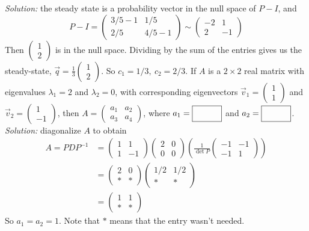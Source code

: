     \ifnum {} {\color{DarkBlue} \textit{Solution:} the steady state is a probability vector in the null space of $P-I$, and $$P-I = \begin{pmatrix} 3/5-1&1/5\\2/5&4/5-1 \end{pmatrix} \sim \begin{pmatrix} -2&1\\2&-1\end{pmatrix}$$ Then $\begin{pmatrix} 1\\2\end{pmatrix}$ is in the null space. Dividing by the sum of the entries gives us the steady-state, $\vec q = \frac13 \begin{pmatrix} 1\\2\end{pmatrix}$. So $c_1 = 1/3, \ c_2 = 2/3$. } \fi        
\fi 
\ifnum {}
    If $A$ is a $2\times 2$ real matrix with eigenvalues $\lambda_1=2$ and $\lambda_2=0$, with corresponding eigenvectors $\vec v_1 = \begin{pmatrix} 1\\1 \end{pmatrix}$ and $\vec v_2 = \begin{pmatrix} 1\\-1\end{pmatrix}$, then $A = \begin{pmatrix}  a_1&a_2\\a_3&a_4\end{pmatrix}$, where $a_1 = \framebox{\strut\hspace{1cm}}$ and $a_2 = \framebox{\strut\hspace{1cm}}$.
    \ifnum {} {\color{DarkBlue} \textit{Solution:}  diagonalize $A$ to obtain \begin{align*}A=PDP^{-1} 
    &= \begin{pmatrix} 1&1\\1&-1\end{pmatrix}\begin{pmatrix} 2&0\\0&0\end{pmatrix}\left( \frac{1}{\det P} \begin{pmatrix} -1&-1\\-1&1\end{pmatrix}\right) \\ 
    &= \begin{pmatrix} 2&0\\\ast & \ast \end{pmatrix} \begin{pmatrix} 1/2 &1/2\\\ast & \ast \end{pmatrix}\\
    &=\begin{pmatrix} 1&1\\\ast & \ast \end{pmatrix}
    \end{align*}
    So $a_1=a_2=1$. Note that $\ast$ means that the entry wasn't needed. 
    } \fi     
